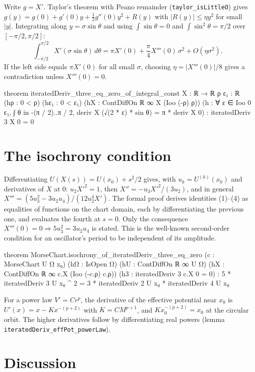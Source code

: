 \documentclass[11pt]{article}
\theoremstyle{remark}
\begin{document}
Write $g=X'$. Taylor's theorem with Peano remainder (\texttt{taylor\_isLittleO}) gives
$g(y)=g(0)+g'(0)y+\tfrac12g''(0)y^2+R(y)$ with $|R(y)|\le\eta y^2$ for small $|y|$. Integrating
along $y=\sigma\sin\theta$ and using $\int\sin\theta=0$ and $\int\sin^2\theta=\pi/2$ over
$[-\pi/2,\pi/2]$:
\[
  \int_{-\pi/2}^{\pi/2}X'(\sigma\sin\theta)\,d\theta=\pi X'(0)+\frac{\pi}{4}X'''(0)\,\sigma^2+O(\eta\sigma^2).
\]
If the left side equals $\pi X'(0)$ for all small $\sigma$, choosing $\eta=|X'''(0)|/8$ gives a
contradiction unless $X'''(0)=0$.

\begin{lean}
theorem iteratedDeriv_three_eq_zero_of_integral_const {X : ℝ → ℝ} {ρ ε₁ : ℝ} (hρ : 0 < ρ)
    (hε₁ : 0 < ε₁) (hX : ContDiffOn ℝ ∞ X (Ioo (-ρ) ρ))
    (h : ∀ ε ∈ Ioo 0 ε₁, ∫ θ in -(π / 2)..π / 2, deriv X (√(2 * ε) * sin θ) = π * deriv X 0) :
    iteratedDeriv 3 X 0 = 0
\end{lean}

\section{The isochrony condition}\label{sec:isochrony}

Differentiating $U(X(s))=U(x_0)+s^2/2$ gives, with $u_k=U^{(k)}(x_0)$ and derivatives of $X$ at
$0$: $u_2X'^2=1$, then $X''=-u_3X'^2/(3u_2)$, and in general
$X'''=(5u_3^2-3u_2u_4)/(12u_2^4X')$. The formal proof derives identities (1)--(4) as equalities of
functions on the chart domain, each by differentiating the previous one, and evaluates the fourth
at $s=0$. Only the consequence $X'''(0)=0\Rightarrow5u_3^2=3u_2u_4$ is stated. This is the
well-known second-order condition for an oscillator's period to be independent of its amplitude.

\begin{lean}
theorem MorseChart.isochrony_of_iteratedDeriv_three_eq_zero (c : MorseChart U Ω x₀)
    (hΩ : IsOpen Ω) (hU : ContDiffOn ℝ ∞ U Ω) (hX : ContDiffOn ℝ ∞ c.X (Ioo (-c.ρ) c.ρ))
    (h3 : iteratedDeriv 3 c.X 0 = 0) :
    5 * iteratedDeriv 3 U x₀ ^ 2 = 3 * iteratedDeriv 2 U x₀ * iteratedDeriv 4 U x₀
\end{lean}

For a power law $V'=Cr^p$, the derivative of the effective potential near $x_0$ is
$U'(x)=x-Kx^{-(p+2)}$ with $K=CM^{p+1}$, and $Kx_0^{-(p+2)}=x_0$ at the circular orbit. The
higher derivatives follow by differentiating real powers (lemma
\texttt{iteratedDeriv\_effPot\_powerLaw}).

\section{Discussion}\label{sec:discussion}
\end{document}
